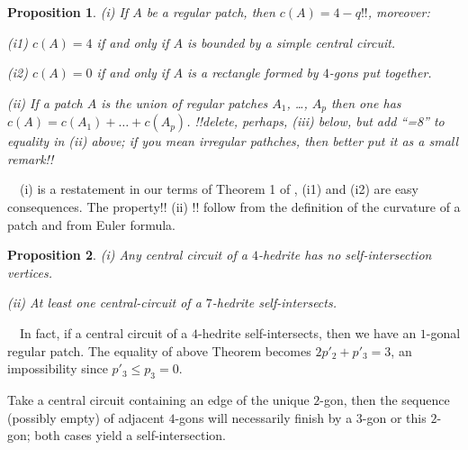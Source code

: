 \documentclass[12pt]{article}
\newtheorem{proposition}{Proposition}
\newcommand{\proof}{\noindent{\bf Proof.}\ \ }
\begin{document}
\begin{proposition}\label{Local-Euler-Formula}
(i) If $A$ be a regular patch, then $c(A)=4-q!!$, moreover:

(i1) $c(A)=4$ if and only if $A$ is bounded by a simple central circuit.

(i2) $c(A)=0$ if and only if $A$ is a rectangle formed by $4$-gons put 
together.

(ii) If a patch $A$ is the union of regular patches $A_1$, \dots, $A_p$ then one has $c(A)=c(A_1)+\dots+c(A_p)$.
!!delete, perhaps, (iii) below, but add ``=8'' to equality in (ii) above;
if you mean irregular pathches, then  better put it as a small remark!!
\end{proposition}
\proof (i) is a restatement in our terms of Theorem 1 of \cite{DSt}, (i1) and (i2) are easy consequences. The property!! (ii) !! follow from the definition of the curvature of a patch and from Euler formula.






\begin{proposition}
(i) Any central circuit of a $4$-hedrite has no self-intersection vertices.

(ii) At least one central-circuit of a $7$-hedrite self-intersects.
\end{proposition}
\proof In fact, if a central circuit of a $4$-hedrite self-intersects, then we have an $1$-gonal regular patch. The equality of above Theorem becomes $2p'_2+p'_3=3$, an impossibility since $p'_3\leq p_3=0$.

Take a central circuit containing an edge of the unique $2$-gon, then the sequence (possibly empty) of adjacent $4$-gons will necessarily finish by a $3$-gon or this $2$-gon; both cases yield a self-intersection.






\end{document}
